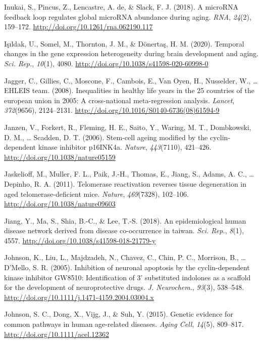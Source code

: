\documentclass[12pt,twoside]{unicam}
\begin{document}
\begin{cslreferences}
\leavevmode\hypertarget{ref-Inukai2018}{}%
Inukai, S., Pincus, Z., Lencastre, A. de, \& Slack, F. J. (2018). A microRNA feedback loop regulates global microRNA abundance during aging. \emph{RNA}, \emph{24}(2), 159--172. \url{http://doi.org/10.1261/rna.062190.117}

\leavevmode\hypertarget{ref-Isildak2020}{}%
Işıldak, U., Somel, M., Thornton, J. M., \& Dönertaş, H. M. (2020). Temporal changes in the gene expression heterogeneity during brain development and aging. \emph{Sci. Rep.}, \emph{10}(1), 4080. \url{http://doi.org/10.1038/s41598-020-60998-0}

\leavevmode\hypertarget{ref-Jagger2008}{}%
Jagger, C., Gillies, C., Moscone, F., Cambois, E., Van Oyen, H., Nusselder, W., \ldots{} EHLEIS team. (2008). Inequalities in healthy life years in the 25 countries of the european union in 2005: A cross-national meta-regression analysis. \emph{Lancet}, \emph{372}(9656), 2124--2131. \url{http://doi.org/10.1016/S0140-6736(08)61594-9}

\leavevmode\hypertarget{ref-Janzen2006}{}%
Janzen, V., Forkert, R., Fleming, H. E., Saito, Y., Waring, M. T., Dombkowski, D. M., \ldots{} Scadden, D. T. (2006). Stem-cell ageing modified by the cyclin-dependent kinase inhibitor p16INK4a. \emph{Nature}, \emph{443}(7110), 421--426. \url{http://doi.org/10.1038/nature05159}

\leavevmode\hypertarget{ref-Jaskelioff2011}{}%
Jaskelioff, M., Muller, F. L., Paik, J.-H., Thomas, E., Jiang, S., Adams, A. C., \ldots{} Depinho, R. A. (2011). Telomerase reactivation reverses tissue degeneration in aged telomerase-deficient mice. \emph{Nature}, \emph{469}(7328), 102--106. \url{http://doi.org/10.1038/nature09603}

\leavevmode\hypertarget{ref-Jiang2018}{}%
Jiang, Y., Ma, S., Shia, B.-C., \& Lee, T.-S. (2018). An epidemiological human disease network derived from disease co-occurrence in taiwan. \emph{Sci. Rep.}, \emph{8}(1), 4557. \url{http://doi.org/10.1038/s41598-018-21779-y}

\leavevmode\hypertarget{ref-Johnson2005}{}%
Johnson, K., Liu, L., Majdzadeh, N., Chavez, C., Chin, P. C., Morrison, B., \ldots{} D'Mello, S. R. (2005). Inhibition of neuronal apoptosis by the cyclin-dependent kinase inhibitor GW8510: Identification of 3' substituted indolones as a scaffold for the development of neuroprotective drugs. \emph{J. Neurochem.}, \emph{93}(3), 538--548. \url{http://doi.org/10.1111/j.1471-4159.2004.03004.x}

\leavevmode\hypertarget{ref-Johnson2015}{}%
Johnson, S. C., Dong, X., Vijg, J., \& Suh, Y. (2015). Genetic evidence for common pathways in human age-related diseases. \emph{Aging Cell}, \emph{14}(5), 809--817. \url{http://doi.org/10.1111/acel.12362}


\end{cslreferences}
\end{document}
